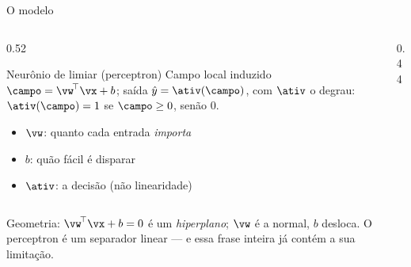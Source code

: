 \documentclass[aspectratio=169, 11pt]{beamer}
\begin{document}
\begin{frame}{O modelo}
  \begin{columns}[T]
    \begin{column}{0.52\textwidth}
      \begin{defbox}{Neurônio de limiar (perceptron)}
        Campo local induzido \(\campo = \vw^{\!\top}\vx + b\); saída
        \(\hat{y} = \ativ(\campo)\), com \(\ativ\) o degrau:
        \(\ativ(\campo) = 1\) se \(\campo \ge 0\), senão \(0\).
      \end{defbox}
      \begin{itemize}\setlength{\itemsep}{0.2ex}
        \item $\vw$: quanto cada entrada \emph{importa}
        \item $b$: quão fácil é disparar
        \item $\ativ$: a decisão (não linearidade)
      \end{itemize}
    \end{column}
    \begin{column}{0.44\textwidth}
      \begin{center}
        \scalebox{0.72}{\perceptron}
      \end{center}
    \end{column}
  \end{columns}

  \begin{ideiabox}
    Geometria: \(\vw^{\!\top}\vx + b = 0\) é um \emph{hiperplano}; $\vw$ é a
    normal, $b$ desloca. O perceptron é um separador linear — e essa frase
    inteira já contém a sua limitação.
  \end{ideiabox}
\end{frame}
\end{document}
